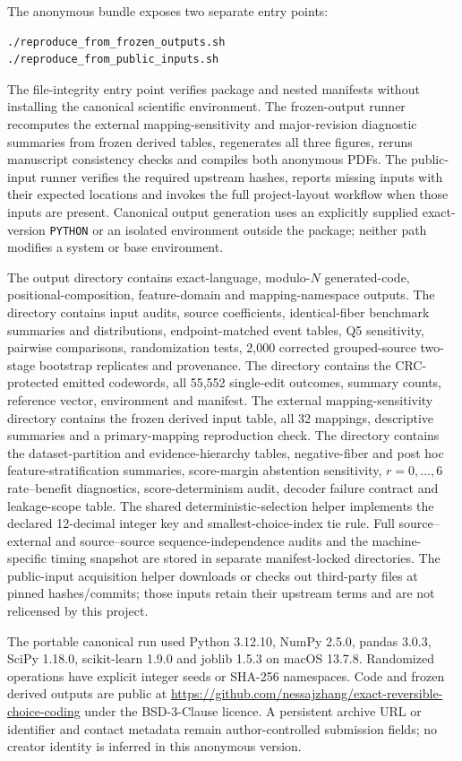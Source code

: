\documentclass[10pt]{article}
\begin{document}
The anonymous bundle exposes two separate entry points:
\begin{verbatim}
./reproduce_from_frozen_outputs.sh
./reproduce_from_public_inputs.sh
\end{verbatim}
The file-integrity entry point verifies package and nested manifests without installing the canonical scientific environment. The frozen-output runner recomputes the external mapping-sensitivity and major-revision diagnostic summaries from frozen derived tables, regenerates all three figures, reruns manuscript consistency checks and compiles both anonymous PDFs. The public-input runner verifies the required upstream hashes, reports missing inputs with their expected locations and invokes the full project-layout workflow when those inputs are present. Canonical output generation uses an explicitly supplied exact-version \texttt{PYTHON} or an isolated environment outside the package; neither path modifies a system or base environment.

The  output directory contains exact-language, modulo-$N$ generated-code, positional-composition, feature-domain and mapping-namespace outputs. The  directory contains input audits, source coefficients, identical-fiber benchmark summaries and distributions, endpoint-matched event tables, Q5 sensitivity, pairwise comparisons, randomization tests, 2,000 corrected grouped-source two-stage bootstrap replicates and provenance. The  directory contains the CRC-protected emitted codewords, all 55,552 single-edit outcomes, summary counts, reference vector, environment and manifest. The external mapping-sensitivity directory contains the frozen derived input table, all 32 mappings, descriptive summaries and a primary-mapping reproduction check. The  directory contains the dataset-partition and evidence-hierarchy tables, negative-fiber and post hoc feature-stratification summaries, score-margin abstention sensitivity, $r=0,\ldots,6$ rate--benefit diagnostics, score-determinism audit, decoder failure contract and leakage-scope table. The shared deterministic-selection helper implements the declared 12-decimal integer key and smallest-choice-index tie rule. Full source--external and source--source sequence-independence audits and the machine-specific timing snapshot are stored in separate manifest-locked directories. The public-input acquisition helper downloads or checks out third-party files at pinned hashes/commits; those inputs retain their upstream terms and are not relicensed by this project.

The portable canonical run used Python 3.12.10, NumPy 2.5.0, pandas 3.0.3, SciPy 1.18.0, scikit-learn 1.9.0 and joblib 1.5.3 on macOS 13.7.8. Randomized operations have explicit integer seeds or SHA-256 namespaces. Code and frozen derived outputs are public at \url{https://github.com/nessajzhang/exact-reversible-choice-coding} under the BSD-3-Clause licence. A persistent archive URL or identifier and contact metadata remain author-controlled submission fields; no creator identity is inferred in this anonymous version.

\begingroup
\small


\endgroup
\end{document}
